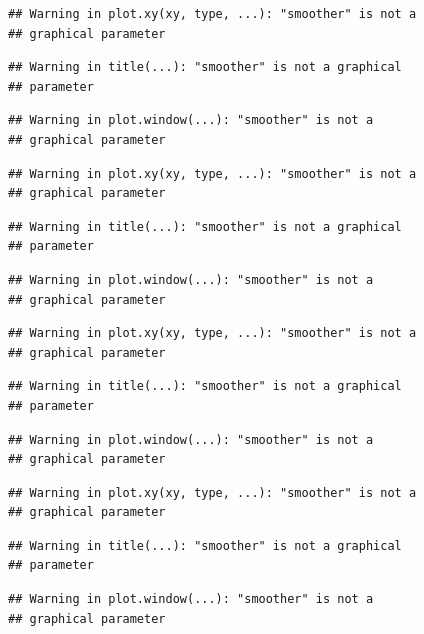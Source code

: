 \documentclass[12pt,]{krantz}
\begin{document}
\begin{verbatim}
## Warning in plot.xy(xy, type, ...): "smoother" is not a
## graphical parameter
\end{verbatim}

\begin{verbatim}
## Warning in title(...): "smoother" is not a graphical
## parameter
\end{verbatim}

\begin{verbatim}
## Warning in plot.window(...): "smoother" is not a
## graphical parameter
\end{verbatim}

\begin{verbatim}
## Warning in plot.xy(xy, type, ...): "smoother" is not a
## graphical parameter
\end{verbatim}

\begin{verbatim}
## Warning in title(...): "smoother" is not a graphical
## parameter
\end{verbatim}

\begin{verbatim}
## Warning in plot.window(...): "smoother" is not a
## graphical parameter
\end{verbatim}

\begin{verbatim}
## Warning in plot.xy(xy, type, ...): "smoother" is not a
## graphical parameter
\end{verbatim}

\begin{verbatim}
## Warning in title(...): "smoother" is not a graphical
## parameter
\end{verbatim}

\begin{verbatim}
## Warning in plot.window(...): "smoother" is not a
## graphical parameter
\end{verbatim}

\begin{verbatim}
## Warning in plot.xy(xy, type, ...): "smoother" is not a
## graphical parameter
\end{verbatim}

\begin{verbatim}
## Warning in title(...): "smoother" is not a graphical
## parameter
\end{verbatim}

\begin{verbatim}
## Warning in plot.window(...): "smoother" is not a
## graphical parameter
\end{verbatim}
\end{document}
